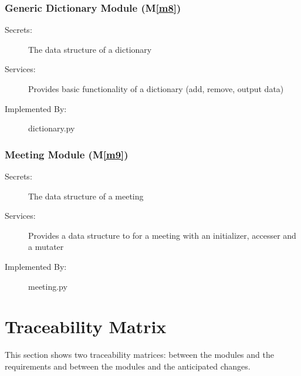 \documentclass[12pt, titlepage]{article}
\newcommand{\mref}[1]{M\ref{#1}}
\begin{document}
\subsubsection{Generic Dictionary Module (\mref{m8})}
\begin{description}
    \item[Secrets:] The data structure of a dictionary
    \item[Services:] Provides basic functionality of a dictionary (add, remove, output data)
    \item[Implemented By:] dictionary.py
\end{description}

\subsubsection{Meeting Module (\mref{m9})}
\begin{description}
    \item[Secrets:] The data structure of a meeting
    \item[Services:] Provides a data structure to for a meeting with an initializer, accesser and a mutater
    \item[Implemented By:] meeting.py
\end{description}

\section{Traceability Matrix} \label{SecTM}

This section shows two traceability matrices: between the modules and the
requirements and between the modules and the anticipated changes.
\end{document}
